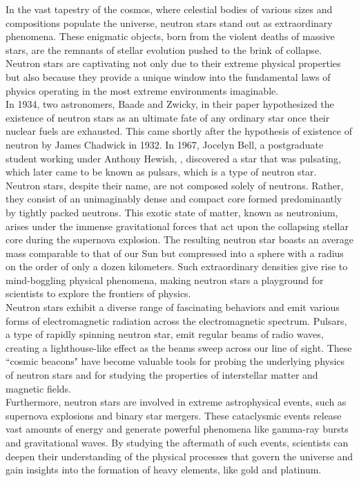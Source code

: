 
\normalsize

In the vast tapestry of the cosmos, where celestial bodies of various sizes and compositions populate the universe, neutron stars stand out as extraordinary phenomena. These enigmatic objects, born from the violent deaths of massive stars, are the remnants of stellar evolution pushed to the brink of collapse. Neutron stars are captivating not only due to their extreme physical properties but also because they provide a unique window into the fundamental laws of physics operating in the most extreme environments imaginable.\\

In 1934, two astronomers, Baade and Zwicky, in their paper  hypothesized the existence of neutron stars as an ultimate fate of any ordinary star once their nuclear fuels are exhausted. This came shortly after the hypothesis of existence of neutron by James Chadwick   in 1932. In 1967, Jocelyn Bell, a postgraduate student working under Anthony Hewish, , discovered a star that was pulsating, which later came to be known as pulsars, which is a type of neutron star.\\

Neutron stars, despite their name, are not composed solely of neutrons. Rather, they consist of an unimaginably dense and compact core formed predominantly by tightly packed neutrons. This exotic state of matter, known as neutronium, arises under the immense gravitational forces that act upon the collapsing stellar core during the supernova explosion. The resulting neutron star boasts an average mass comparable to that of our Sun but compressed into a sphere with a radius on the order of only a dozen kilometers. Such extraordinary densities give rise to mind-boggling physical phenomena, making neutron stars a playground for scientists to explore the frontiers of physics.\\

\newpage
Neutron stars exhibit a diverse range of fascinating behaviors and emit various forms of electromagnetic radiation across the electromagnetic spectrum. Pulsars, a type of rapidly spinning neutron star, emit regular beams of radio waves, creating a lighthouse-like effect as the beams sweep across our line of sight. These ``cosmic beacons" have become valuable tools for probing the underlying physics of neutron stars and for studying the properties of interstellar matter and magnetic fields.\\

Furthermore, neutron stars are involved in extreme astrophysical events, such as supernova explosions and binary star mergers. These cataclysmic events release vast amounts of energy and generate powerful phenomena like gamma-ray bursts and gravitational waves. By studying the aftermath of such events, scientists can deepen their understanding of the physical processes that govern the universe and gain insights into the formation of heavy elements, like gold and platinum.\\
